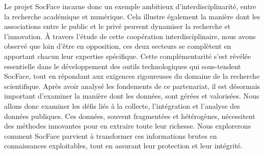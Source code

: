 Le projet SocFace incarne donc un exemple ambitieux d’interdisciplinarité, entre la recherche académique et numérique. Cela illustre également la manière dont les associations entre le public et le privé peuvent dynamiser la recherche et l’innovation. À travers l’étude de cette coopération interdisciplinaire, nous avons observé que loin d’être en opposition, ces deux secteurs se complètent en apportant chacun leur expertise spécifique. Cette complémentarité s’est révélée essentielle dans le développement des outils technologiques qui sous-tendent SocFace, tout en répondant aux exigences rigoureuses du domaine de la recherche scientifique. Après avoir analysé les fondements de ce partenariat, il est désormais important d’examiner la manière dont les données, sont gérées et valorisées. Nous allons donc examiner les défis liés à la collecte, l’intégration et l’analyse des données publiques. Ces données, souvent fragmentées et hétérogènes, nécessitent des méthodes innovantes pour en extraire toute leur richesse. Nous explorerons comment SocFace parvient à transformer ces informations brutes en connaissances exploitables, tout en assurant leur protection et leur intégrité.